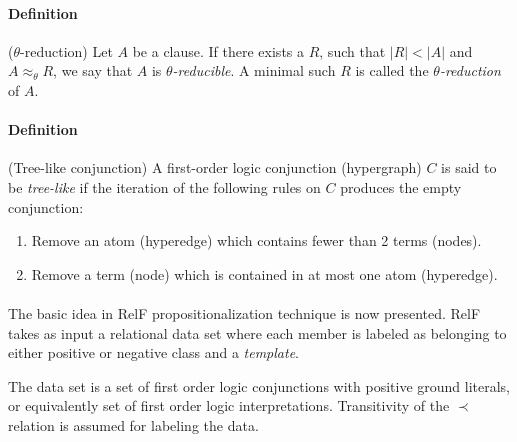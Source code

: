 \documentclass[11pt,twoside,a4paper]{book}
\newcounter{Definition}
\begin{document}
\paragraph{Definition} ($\theta$-reduction) Let $A$ be a clause.
If there exists a $R$, such that $|R| < |A|$ and $A \approx_{\theta} R$,
we say that $A$ is \emph{$\theta$-reducible}. 
A minimal such $R$ is called the \emph{$\theta$-reduction} of $A$.

\paragraph{Definition}   (Tree-like conjunction) A first-order logic conjunction (hypergraph) $C$
is said to be \emph{tree-like} if the iteration of the following rules on $C$
produces the empty conjunction:
\begin{enumerate}
 \item Remove an atom (hyperedge) which contains fewer than 2 terms (nodes).
 \item Remove a term (node) which is contained in at most one atom (hyperedge).
\end{enumerate}


\paragraph{ } The basic idea in RelF propositionalization technique is now presented.
RelF takes as input a relational data set
where each member is labeled as belonging to either positive or negative class
and a \emph{template}. 

The data set is a set of first order logic conjunctions with positive ground literals,
or equivalently set of first order logic interpretations.
Transitivity of the $\prec$ relation is assumed for labeling the data.
\end{document}

